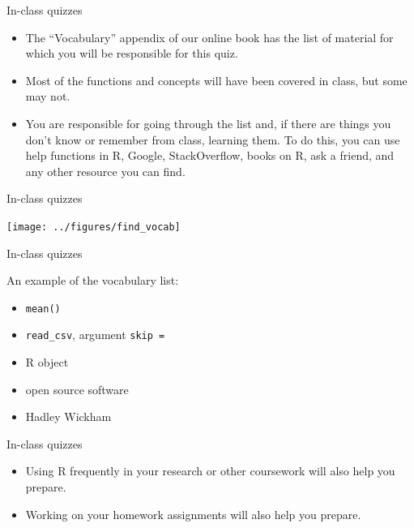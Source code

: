 \documentclass[
  10pt,
  ignorenonframetext,
]{beamer}
\providecommand{\tightlist}{%
  \setlength{\itemsep}{0pt}\setlength{\parskip}{0pt}}
\begin{document}
\begin{frame}{In-class quizzes}
\protect\hypertarget{in-class-quizzes-5}{}

\begin{itemize}
\tightlist
\item
  The ``Vocabulary'' appendix of our online book has the list of
  material for which you will be responsible for this quiz.
\item
  Most of the functions and concepts will have been covered in class,
  but some may not.
\item
  You are responsible for going through the list and, if there are
  things you don't know or remember from class, learning them. To do
  this, you can use help functions in R, Google, StackOverflow, books on
  R, ask a friend, and any other resource you can find.
\end{itemize}

\end{frame}

\begin{frame}{In-class quizzes}
\protect\hypertarget{in-class-quizzes-6}{}

\begin{center}\texttt{[image: ../figures/find\_vocab]} \end{center}

\end{frame}

\begin{frame}[fragile]{In-class quizzes}
\protect\hypertarget{in-class-quizzes-7}{}

An example of the vocabulary list:

\begin{itemize}
\tightlist
\item
  \texttt{mean()}
\item
  \texttt{read\_csv}, argument \texttt{skip\ =}
\item
  R object
\item
  open source software
\item
  Hadley Wickham
\end{itemize}

\end{frame}

\begin{frame}{In-class quizzes}
\protect\hypertarget{in-class-quizzes-8}{}

\begin{itemize}
\tightlist
\item
  Using R frequently in your research or other coursework will also help
  you prepare.
\item
  Working on your homework assignments will also help you prepare.
\end{itemize}

\end{frame}
\end{document}
